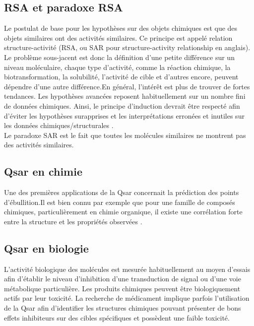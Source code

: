 \documentclass[12pt]{report}
\begin{document}
\subsection{RSA et paradoxe RSA }
Le postulat de base pour les hypothèses sur des objets chimiques est que des objets similaires ont des activités similaires. Ce principe est appelé relation structure-activité (RSA, ou SAR pour structure-activity relationship en anglais). Le problème sous-jacent est donc la définition d'une petite différence sur un niveau moléculaire, chaque type d'activité, comme la réaction chimique, la biotransformation, la solubilité, l'activité de cible et d'autres encore, peuvent dépendre d'une autre différence.En général, l'intérêt est plus de trouver de fortes tendances. Les hypothèses avancées reposent habituellement sur un nombre fini de données chimiques. Ainsi, le principe d'induction devrait être respecté afin d'éviter les hypothèses surapprises et les interprétations erronées et inutiles sur les données chimiques/structurales \cite{ref9}.\\
Le paradoxe SAR est le fait que toutes les molécules similaires ne montrent pas des activités similaires. 

\subsection{Qsar en chimie}
Une des premières applications de la Qsar concernait la prédiction des points d'ébullition.Il est bien connu par exemple que pour une famille de composés chimiques, particulièrement en chimie organique, il existe une corrélation forte entre la structure et les propriétés observées \cite{ref9}.

\subsection{Qsar en biologie}
L'activité biologique des molécules est mesurée habituellement au moyen d'essais afin d'établir le niveau d'inhibition d'une transduction de signal ou d'une voie métabolique particulière. Les produits chimiques peuvent être biologiquement actifs par leur toxicité. La recherche de médicament implique parfois l'utilisation de la Qsar afin d'identifier les structures chimiques pouvant présenter de bons effets inhibiteurs sur des cibles spécifiques et possèdent une faible toxicité.
\end{document}
